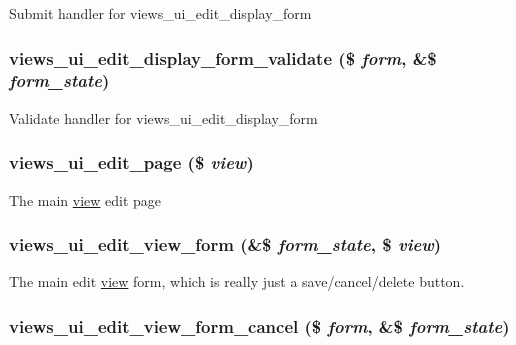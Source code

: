 Submit handler for views\_\-ui\_\-edit\_\-display\_\-form \hypertarget{admin_8inc_a266b14e787266b24a7096f58d41667c}{
\subsubsection[{views\_\-ui\_\-edit\_\-display\_\-form\_\-validate}]{\setlength{\rightskip}{0pt plus 5cm}views\_\-ui\_\-edit\_\-display\_\-form\_\-validate (\$ {\em form}, \/  \&\$ {\em form\_\-state})}}
\label{admin_8inc_a266b14e787266b24a7096f58d41667c}


Validate handler for views\_\-ui\_\-edit\_\-display\_\-form \hypertarget{admin_8inc_6a5646e000d998b490692537945f1e80}{
\subsubsection[{views\_\-ui\_\-edit\_\-page}]{\setlength{\rightskip}{0pt plus 5cm}views\_\-ui\_\-edit\_\-page (\$ {\em view})}}
\label{admin_8inc_6a5646e000d998b490692537945f1e80}


The main \hyperlink{classview}{view} edit page \hypertarget{admin_8inc_1272fedcbb93770da96b8da5ec4bc611}{
\subsubsection[{views\_\-ui\_\-edit\_\-view\_\-form}]{\setlength{\rightskip}{0pt plus 5cm}views\_\-ui\_\-edit\_\-view\_\-form (\&\$ {\em form\_\-state}, \/  \$ {\em view})}}
\label{admin_8inc_1272fedcbb93770da96b8da5ec4bc611}


The main edit \hyperlink{classview}{view} form, which is really just a save/cancel/delete button. \hypertarget{admin_8inc_c138be787565f55b939741a65574a8ea}{
\subsubsection[{views\_\-ui\_\-edit\_\-view\_\-form\_\-cancel}]{\setlength{\rightskip}{0pt plus 5cm}views\_\-ui\_\-edit\_\-view\_\-form\_\-cancel (\$ {\em form}, \/  \&\$ {\em form\_\-state})}}
\label{admin_8inc_c138be787565f55b939741a65574a8ea}


